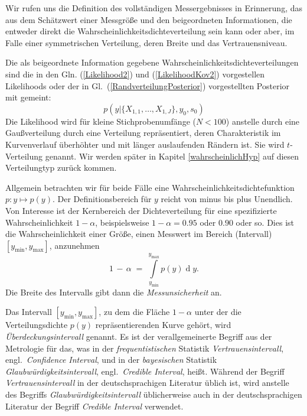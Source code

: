 Wir rufen uns die Definition des vollständigen Messergebnisses in Erinnerung, das aus
dem Schätzwert einer Messgröße und den beigeordneten Informationen, die entweder
direkt die Wahrscheinlichkeitsdichteverteilung sein kann oder aber, im Falle einer
symmetrischen Verteilung, deren Breite und das Vertrauensniveau.

Die als beigeordnete Information gegebene Wahrscheinlichkeitsdichteverteilungen sind
die in den Gln. (\ref{Likelihood2}) und (\ref{LikelihoodKov2}) vorgestellen Likelihoods oder
der in Gl.~(\ref{RandverteilungPosterior}) vorgestellten Posterior
mit gemeint:
$$
p(y | \{X_{1,1}, \dots, X_{1,J}\}, y_0, s_0)
$$
Die Likelihood wird
für kleine Stich\-proben\-um\-fänge ($N < 100$) anstelle durch eine Gaußverteilung durch eine Verteilung
repräsentiert, deren Charakteristik im Kurvenverlauf
überhöhter und mit länger auslaufenden Rändern ist. Sie wird $t$-Verteilung genannt.
Wir werden später in Kapitel \ref{wahrscheinlichHyp} auf diesen Verteilungtyp zurück kommen.

Allgemein betrachten wir für beide Fälle eine Wahrscheinlichkeitsdichtefunktion $p \! : y \mapsto p(y)$.
Der Definitionsbereich für $y$ reicht von minus bis plus Unendlich. Von Interesse ist der Kernbereich
der Dichteverteilung für eine spezifizierte Wahrscheinlichkeit $1-\alpha$, beispielsweise
$1-\alpha = 0.95$ oder $0.90$ oder so.
Dies ist die Wahrscheinlichkeit einer Größe, einen Messwert im Bereich (Intervall) $[y_\mathrm{min}, y_\mathrm{max}]$,
anzunehmen
\begin{equation}
1 \, - \, \alpha \; = \;
\int\limits_{y_\mathrm{min}}^{y_\mathrm{max}} p(y)
\operatorname{d}y .
\label{UeberdeckungWahrscheinlichkeit}
\end{equation}
Die Breite des Intervalls gibt dann die \textsl{Messunsicherheit} an.

Das Intervall $[y_\mathrm{min}, y_\mathrm{max}]$, zu dem die Fläche $1 - \alpha$ unter der die
Verteilungsdichte $p(y)$ repräsentierenden Kurve gehört, wird \textsl{Überdeckungsintervall} genannt.
Es ist der verallgemeinerte Begriff aus der Metrologie für das, was in der
\textsl{frequentistischen} Statistik \textsl{Vertrauensintervall},
engl.\  \textsl{Confidence Interval}, und in der \textsl{bayesischen} Statistik
\textsl{Glaubwürdigkeitsintervall}, engl.\ \textsl{Credible Interval},
heißt. Während der Begriff \textsl{Vertrauensintervall} in der deutschsprachigen
Literatur üblich ist, wird anstelle des Begriffs \textsl{Glaubwürdigkeitsintervall} üblicherweise
auch in der deutschsprachigen Literatur der Begriff \textsl{Credible Interval} verwendet.

